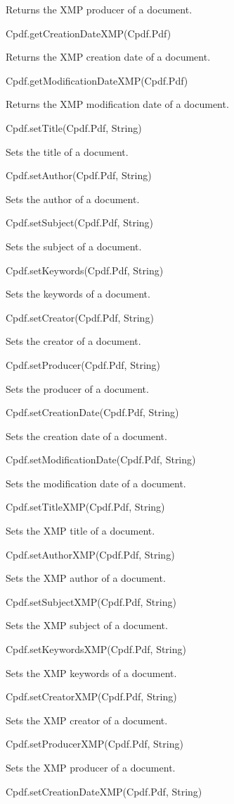 Returns the XMP producer of a document.


Cpdf.getCreationDateXMP(Cpdf.Pdf)


Returns the XMP creation date of a document.


Cpdf.getModificationDateXMP(Cpdf.Pdf)


Returns the XMP modification date of a document.


Cpdf.setTitle(Cpdf.Pdf, String)


Sets the title of a document.


Cpdf.setAuthor(Cpdf.Pdf, String)


Sets the author of a document.


Cpdf.setSubject(Cpdf.Pdf, String)


Sets the subject of a document.


Cpdf.setKeywords(Cpdf.Pdf, String)


Sets the keywords of a document.


Cpdf.setCreator(Cpdf.Pdf, String)


Sets the creator of a document.


Cpdf.setProducer(Cpdf.Pdf, String)


Sets the producer of a document.


Cpdf.setCreationDate(Cpdf.Pdf, String)


Sets the creation date of a document.


Cpdf.setModificationDate(Cpdf.Pdf, String)


Sets the modification date of a document.


Cpdf.setTitleXMP(Cpdf.Pdf, String)


Sets the XMP title of a document.


Cpdf.setAuthorXMP(Cpdf.Pdf, String)


Sets the XMP author of a document.


Cpdf.setSubjectXMP(Cpdf.Pdf, String)


Sets the XMP subject of a document.


Cpdf.setKeywordsXMP(Cpdf.Pdf, String)


Sets the XMP keywords of a document.


Cpdf.setCreatorXMP(Cpdf.Pdf, String)


Sets the XMP creator of a document.


Cpdf.setProducerXMP(Cpdf.Pdf, String)


Sets the XMP producer of a document.


Cpdf.setCreationDateXMP(Cpdf.Pdf, String)


